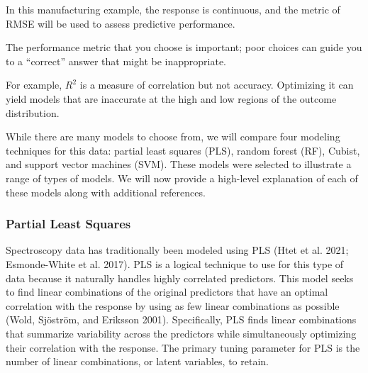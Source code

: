 \documentclass[
  letterpaper,
  DIV=11,
  numbers=noendperiod]{scrartcl}
\begin{document}
In this manufacturing example, the response is continuous, and the
metric of RMSE will be used to assess predictive performance.

\begin{tcolorbox}[enhanced jigsaw, title=\textcolor{quarto-callout-important-color}{\faExclamation}\hspace{0.5em}{\textbf{WTF} \#10}, rightrule=.15mm, leftrule=.75mm, bottomtitle=1mm, opacityback=0, opacitybacktitle=0.6, bottomrule=.15mm, arc=.35mm, colframe=quarto-callout-important-color-frame, breakable, toprule=.15mm, toptitle=1mm, colback=white, titlerule=0mm, coltitle=black, left=2mm, colbacktitle=quarto-callout-important-color!10!white]

The performance metric that you choose is important; poor choices can
guide you to a ``correct'' answer that might be inappropriate.

For example, \(R^2\) is a measure of correlation but not accuracy.
Optimizing it can yield models that are inaccurate at the high and low
regions of the outcome distribution.

\end{tcolorbox}

While there are many models to choose from, we will compare four
modeling techniques for this data: partial least squares (PLS), random
forest (RF), Cubist, and support vector machines (SVM). These models
were selected to illustrate a range of types of models. We will now
provide a high-level explanation of each of these models along with
additional references.

\hypertarget{partial-least-squares}{%
\subsubsection{Partial Least Squares}\label{partial-least-squares}}

Spectroscopy data has traditionally been modeled using PLS (Htet et al.
2021; Esmonde-White et al. 2017). PLS is a logical technique to use for
this type of data because it naturally handles highly correlated
predictors. This model seeks to find linear combinations of the original
predictors that have an optimal correlation with the response by using
as few linear combinations as possible (Wold, Sjöström, and Eriksson
2001). Specifically, PLS finds linear combinations that summarize
variability across the predictors while simultaneously optimizing their
correlation with the response. The primary tuning parameter for PLS is
the number of linear combinations, or latent variables, to retain.
\end{document}
